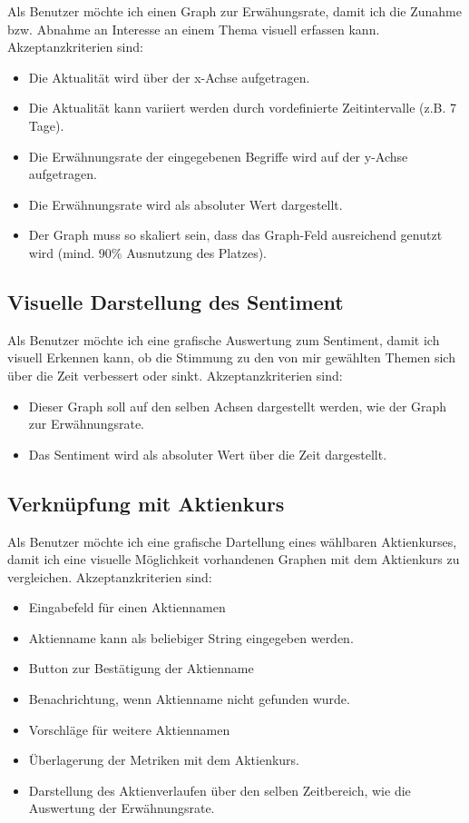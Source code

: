 \documentclass[a4paper, 10pt, conference]{ieeeconf}
\begin{document}
Als Benutzer möchte ich einen Graph zur Erwähungsrate, damit ich die Zunahme bzw. Abnahme an Interesse an einem Thema visuell erfassen kann. Akzeptanzkriterien sind:
\begin{itemize}
\item Die Aktualität wird über der x-Achse aufgetragen.
\item Die Aktualität kann variiert werden durch vordefinierte Zeitintervalle (z.B. 7 Tage).
\item Die Erwähnungsrate der eingegebenen Begriffe wird auf der y-Achse aufgetragen.
\item Die Erwähnungsrate wird als absoluter Wert dargestellt.
\item Der Graph muss so skaliert sein, dass das Graph-Feld ausreichend genutzt wird (mind. 90\% Ausnutzung des Platzes).
\end{itemize}

\subsection{Visuelle Darstellung des Sentiment}

Als Benutzer möchte ich eine grafische Auswertung zum Sentiment, damit ich visuell Erkennen kann, ob die Stimmung zu den von mir gewählten Themen sich über die Zeit verbessert oder sinkt. Akzeptanzkriterien sind:
\begin{itemize}
\item Dieser Graph soll auf den selben Achsen dargestellt werden, wie der Graph zur Erwähnungsrate.
\item Das Sentiment wird als absoluter Wert über die Zeit dargestellt.
\end{itemize}

\subsection{Verknüpfung mit Aktienkurs}

Als Benutzer möchte ich eine grafische Dartellung eines wählbaren Aktienkurses, damit ich eine visuelle Möglichkeit vorhandenen Graphen mit dem Aktienkurs zu vergleichen. Akzeptanzkriterien sind:
\begin{itemize}
\item Eingabefeld für einen Aktiennamen
\item Aktienname kann als beliebiger String eingegeben werden.
\item Button zur Bestätigung der Aktienname
\item Benachrichtung, wenn Aktienname nicht gefunden wurde.
\item Vorschläge für weitere Aktiennamen
\item Überlagerung der Metriken mit dem Aktienkurs.
\item Darstellung des Aktienverlaufen über den selben Zeitbereich, wie die Auswertung der Erwähnungsrate.
\end{itemize}
\end{document}
